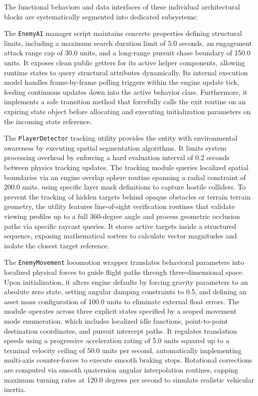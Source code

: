\documentclass[12pt]{report}
\begin{document}
The functional behaviors and data interfaces of these individual architectural blocks are systematically segmented into dedicated subsystems:

The \texttt{EnemyAI} manager script maintains concrete properties defining structural limits, including a maximum search duration limit of 5.0 seconds, an engagement attack range cap of 30.0 units, and a long-range pursuit chase boundary of 150.0 units. It exposes clean public getters for its active helper components, allowing runtime states to query structural attributes dynamically. Its internal execution model handles frame-by-frame polling triggers within the engine update tick, feeding continuous updates down into the active behavior class. Furthermore, it implements a safe transition method that forcefully calls the exit routine on an expiring state object before allocating and executing initialization parameters on the incoming state reference.

The \texttt{PlayerDetector} tracking utility provides the entity with environmental awareness by executing spatial segmentation algorithms. It limits system processing overhead by enforcing a hard evaluation interval of 0.2 seconds between physics tracking updates. The tracking module queries localized spatial boundaries via an engine overlap sphere routine spanning a radial constraint of 200.0 units, using specific layer mask definitions to capture hostile colliders. To prevent the tracking of hidden targets behind opaque obstacles or terrain terrain geometry, the utility features line-of-sight verification routines that validate viewing profiles up to a full 360-degree angle and process geometric occlusion paths via specific raycast queries. It stores active targets inside a structured sequence, exposing mathematical sorters to calculate vector magnitudes and isolate the closest target reference.

The \texttt{EnemyMovement} locomotion wrapper translates behavioral parameters into localized physical forces to guide flight paths through three-dimensional space. Upon initialization, it alters engine defaults by forcing gravity parameters to an absolute zero state, setting angular damping constraints to 0.5, and defining an asset mass configuration of 100.0 units to eliminate external float errors. The module operates across three explicit states specified by a scoped movement mode enumeration, which includes localized idle functions, point-to-point destination coordinates, and pursuit intercept paths. It regulates translation speeds using a progressive acceleration rating of 5.0 units squared up to a terminal velocity ceiling of 50.0 units per second, automatically implementing multi-axis counter-forces to execute smooth braking stops. Rotational corrections are computed via smooth quaternion angular interpolation routines, capping maximum turning rates at 120.0 degrees per second to simulate realistic vehicular inertia.
\end{document}
